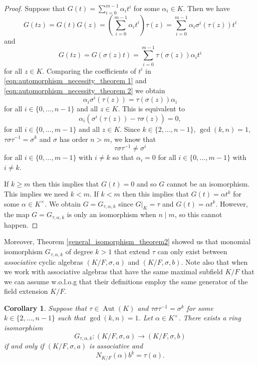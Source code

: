 \documentclass{amsart}
\theoremstyle{plain}
\newtheorem{corollary}[theorem]{Corollary}
\theoremstyle{definition}
\numberwithin{equation}{section}
\numberwithin{figure}{section}
\DeclareMathOperator{\Aut}{Aut}
\begin{document}
 \begin{proof}
 Suppose  that $G(t) = \sum_{i=0}^{m-1} \alpha_i t^i$ for some $\alpha_i \in K$.
Then we have
\begin{equation} \label{eqn:automorphism_necessity_theorem 1}
G(tz) = G(t)G(z) = (\sum_{i=0}^{m-1} \alpha_i t^i ) \tau(z) =
\sum_{i=0}^{m-1} \alpha_i \sigma^{i}(\tau(z)) t^i \end{equation} and
\begin{equation} \label{eqn:automorphism_necessity_theorem 2}
G(tz) =
G(\sigma(z)t) = \sum_{i=0}^{m-1} \tau(\sigma(z)) \alpha_i t^i
\end{equation}
for all $z \in K$. Comparing the coefficients of $t^i$
in \eqref{eqn:automorphism_necessity_theorem 1} and
\eqref{eqn:automorphism_necessity_theorem 2} we obtain
$$\alpha_i \sigma^{i}(\tau(z)) = \tau(\sigma(z)) \alpha_i$$
for all $i \in\{ 0, \ldots, n-1\}$ and all $z \in K$. This is equivalent to
$$\alpha_i (\sigma^i(\tau(z)) - \tau\sigma(z)  )=0,$$
for all $i \in\{ 0, \ldots, m-1 \}$ and all $z \in K$.
Since $k\in \{2,\dots, n-1 \}$, $\gcd (k, n)=1$,
 $\tau \sigma\tau^{-1}=\sigma^k$
 and $\sigma$ has order $n > m$, we know that
 $$\tau \sigma\tau^{-1}\not=\sigma^i$$
 for all  $i \in\{ 0, \ldots, m-1\}$ with $i\not=k$ so that  $\alpha_i = 0$ for
all $ i \in\{ 0, \ldots, m-1\}$  with $i\not=k$.

 If  $k\geq m$ then this implies that $G(t)=0$ and so $G$ cannot be an isomorphism. This implies we need $k<m$.
If $k<m$ then this implies that $G(t) = \alpha t^k$ for some $\alpha\in K^{\times}$.
We obtain $G=G_{\tau,\alpha,k}$
since $G|_{K}=\tau$ and $G(t)=\alpha t^k$.
However, the map $G=G_{\tau,\alpha,k}$ is only an isomorphism when $n\mid m$, so this cannot happen.
\end{proof}


 Moreover, Theorem \ref{general_isomorphism_theorem2} showed us that monomial isomorphism $G_{\tau,\alpha,k}$ of degree $k>1$ that extend $\tau$ can only exist between \emph{associative} cyclic algebras $(K/F,\sigma, a)$ and $(K/F,\sigma, b)$. Note also that when we work with associative algebras that have the same maximal subfield $K/F$ that we can assume w.o.l.o.g that their definitions employ the same generator of the field extension $K/F$.



 \begin{corollary}  \label{cor:general_isomorphism_theorem2}
 Suppose that $\tau\in \Aut(K)$ and $\tau \sigma\tau^{-1}=\sigma^k$ for some $k\in \{2,\dots, n-1 \}$ such that $\gcd (k, n)=1$.
 Let $\alpha\in K^\times$.
 There exists a ring isomorphism $$G_{\tau,\alpha,k}: (K/F,\sigma,a)\to (K/F,\sigma,b)$$
  if and only if
 $(K/F,\sigma,a)$ is associative and
 $$N_{K/F}(\alpha) b^k=\tau(a).$$
 \end{corollary}
\end{document}
